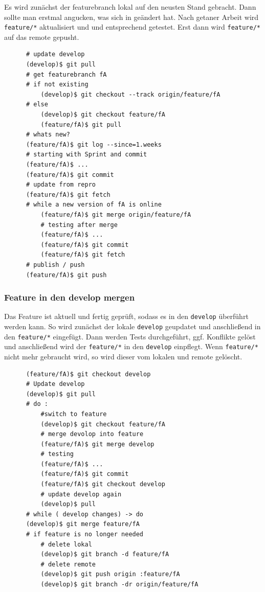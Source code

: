 \documentclass[
   draft=false
  ,paper=a4
  ,twoside=false
  ,fontsize=11pt
  ,headsepline
  ,DIV=11
  ,parskip=full+
  ,titlepage
]{scrartcl} %
\begin{document}
  \begin{minipage}[t]{0.25\linewidth}
     Es wird zunächst der featurebranch lokal auf den neusten Stand gebracht.
     Dann sollte man erstmal angucken, was sich in geändert hat.
     Nach getaner Arbeit wird \texttt{feature/*} aktualisiert und 
     und entsprechend getestet. Erst dann wird \texttt{feature/*} auf 
     das remote gepusht.
  \end{minipage}%
  \hfill
  \begin{minipage}[t]{0.65\linewidth}
    \begin{lstlisting}
      # update develop
      (develop)$ git pull
      # get featurebranch fA 
      # if not existing
          (develop)$ git checkout --track origin/feature/fA
      # else
          (develop)$ git checkout feature/fA
          (feature/fA)$ git pull
      # whats new?
      (feature/fA)$ git log --since=1.weeks
      # starting with Sprint and commit
      (feature/fA)$ ...
      (feature/fA)$ git commit
      # update from repro
      (feature/fA)$ git fetch
      # while a new version of fA is online
          (feature/fA)$ git merge origin/feature/fA
          # testing after merge 
          (feature/fA)$ ...
          (feature/fA)$ git commit
          (feature/fA)$ git fetch 
      # publish / push
      (feature/fA)$ git push 
    \end{lstlisting}
  \end{minipage}%
  
  
  \subsubsection{Feature in den develop mergen}
  \begin{minipage}[t]{0.25\linewidth}
	  Das Feature ist aktuell und fertig geprüft, sodass es 
	  in den \texttt{develop} überführt werden kann. 
	  So wird zunächst der lokale \texttt{develop} geupdatet und
	  anschließend in den \texttt{feature/*} eingefügt. Dann 
	  werden Tests durchgeführt, ggf. Konflikte gelöst und anschließend
	  wird der \texttt{feature/*} in den \texttt{develop} einpflegt.
	  Wenn \texttt{feature/*} nicht mehr gebraucht wird, so wird dieser
	  vom lokalen und remote gelöscht.
  \end{minipage}%
  \hfill
  \begin{minipage}[t]{0.65\linewidth}
    \begin{lstlisting}
      (feature/fA)$ git checkout develop
      # Update develop
      (develop)$ git pull
      # do : 
          #switch to feature 
          (develop)$ git checkout feature/fA 
          # merge devolop into feature
          (feature/fA)$ git merge develop
          # testing
          (feature/fA)$ ...
          (feature/fA)$ git commit
          (feature/fA)$ git checkout develop
          # update develop again
          (develop)$ pull
      # while ( develop changes) -> do 
      (develop)$ git merge feature/fA
      # if feature is no longer needed
          # delete lokal
          (develop)$ git branch -d feature/fA 
          # delete remote  
          (develop)$ git push origin :feature/fA
          (develop)$ git branch -dr origin/feature/fA
    \end{lstlisting}
  \end{minipage}%
  
\end{document}
